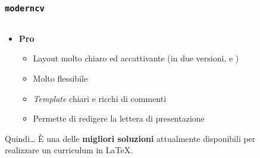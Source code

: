 \documentclass[svgnames,%
	ucs,%
	pdftex]{guitbeamer}
\begin{document}
\begin{frame}
  \frametitle{\texttt{moderncv}}
	\begin{columns}[c]
		\begin{column}{0.6\linewidth}
			\begin{itemize}
			\item \textbf{Pro}
				\begin{itemize}
				\item Layout molto chiaro ed accattivante (in due versioni,  e )
				\item Molto flessibile
				\item \emph{Template} chiari e ricchi di commenti
				\item Permette di redigere la lettera di presentazione
				\end{itemize}
			\end{itemize}
			\begin{block}{Quindi\dots}
			\`E una delle \textbf{migliori soluzioni} attualmente disponibili per realizzare un curriculum in \LaTeX.
			\end{block}
		\end{column}
		\begin{column}{0.4\linewidth}
			\centering
		\end{column}
	\end{columns}
\end{frame}
\end{document}
